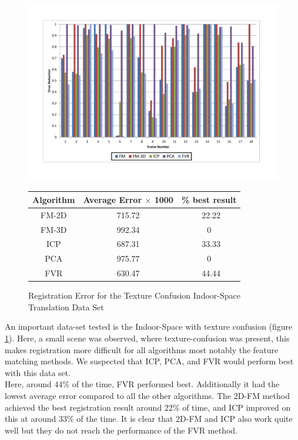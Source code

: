 \begin{figure}
\centering
\includegraphics[width=6in]{images/results/IndoorSpace_texture_confusion_translation}
\caption{Registration Error for the Texture Confusion Indoor-Space Translation Data Set}
\label{fig:PET5}

\begin{tabular}{ccc}
\hline
\textbf{Algorithm} & \textbf{Average Error $\times$ 1000} & \textbf{\% best result}\\ \hline
FM-2D	& 715.72 & ~22.22\\
FM-3D	& 992.34 & 0\\
ICP		& 687.31 & ~33.33\\
PCA		& 975.77 & 0\\
FVR		& 630.47 & ~44.44\\
\end{tabular}
\end{figure} 


An important data-set tested is the Indoor-Space with texture confusion (figure \ref{fig:PET5}). Here, a small scene was observed, where texture-confusion was present, this makes registration more difficult for all algorithms most notably the feature matching methods. We suspected that ICP, PCA, and FVR would perform best with this data set. \\

Here, around 44\% of the time, FVR performed best. Additionally it had the lowest average error compared to all the other algorithms. The 2D-FM method achieved the best registration result around 22\% of time, and ICP improved on this at around 33\% of the time. It is clear that 2D-FM and ICP also work quite well but they do not reach the performance of the FVR method. \\ 


